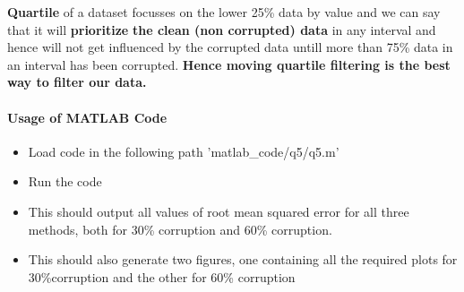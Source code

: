 \documentclass[12pt]{article}
\begin{document}
\textbf{Quartile} of a dataset focusses on the lower 25\% data by value and we can say that it will \textbf{prioritize} \textbf{the clean (non corrupted) data} in any interval and hence will not get influenced by the corrupted data untill more than 75\% data in an interval has been corrupted.
\newline\newline
\textbf{Hence moving quartile filtering is the best way to filter our data.}

\newpage
\paragraph{Usage of MATLAB Code}
\begin{itemize}
\item Load code in the following path 'matlab\_code/q5/q5.m'
\item Run the code
\item This should output all values of root mean squared error for all three methods, both for 30\% corruption and 60\% corruption.
\item This should also generate two figures, one containing all the required plots for 30\%corruption and the other for 60\% corruption
\end{itemize}


\newpage
\end{document}
